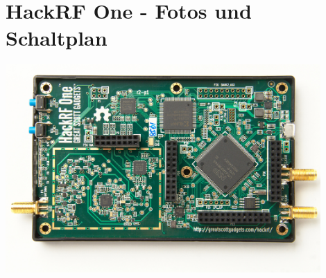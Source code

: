 
\chapter{HackRF One - Fotos und Schaltplan}
\includegraphics[angle=270,width=0.9\textwidth]{content/appendix/HackRF-One-fd0-0009.jpeg}


 